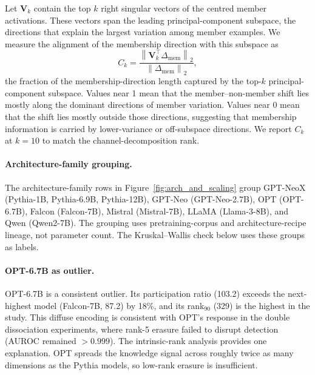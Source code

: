 Let $\mathbf{V}_k$ contain the top $k$ right singular vectors of the centred member activations. These vectors span the leading principal-component subspace, the directions that explain the largest variation among member examples. We measure the alignment of the membership direction with this subspace as
\begin{equation}
C_k = \frac{\left\|\mathbf{V}_k^\top \Delta_{\mathrm{mem}}\right\|_2}{\left\|\Delta_{\mathrm{mem}}\right\|_2},
\label{eq:concentration_ck}
\end{equation}
the fraction of the membership-direction length captured by the top-$k$ principal-component subspace. Values near 1 mean that the member--non-member shift lies mostly along the dominant directions of member variation. Values near 0 mean that the shift lies mostly outside those directions, suggesting that membership information is carried by lower-variance or off-subspace directions. We report $C_k$ at $k = 10$ to match the channel-decomposition rank.

\paragraph{Architecture-family grouping.}
The architecture-family rows in Figure~\ref{fig:arch_and_scaling} group GPT-NeoX (Pythia-1B, Pythia-6.9B, Pythia-12B), GPT-Neo (GPT-Neo-2.7B), OPT (OPT-6.7B), Falcon (Falcon-7B), Mistral (Mistral-7B), LLaMA (Llama-3-8B), and Qwen (Qwen2-7B). The grouping uses pretraining-corpus and architecture-recipe lineage, not parameter count. The Kruskal--Wallis check below uses these groups as labels.

\paragraph{OPT-6.7B as outlier.}
OPT-6.7B is a consistent outlier. Its participation ratio (103.2) exceeds the next-highest model (Falcon-7B, 87.2) by 18\%, and its rank$_{90}$ (329) is the highest in the study.
This diffuse encoding is consistent with OPT's response in the double dissociation experiments, where rank-5 erasure failed to disrupt detection (AUROC remained $> 0.999$).
The intrinsic-rank analysis provides one explanation. OPT spreads the knowledge signal across roughly twice as many dimensions as the Pythia models, so low-rank erasure is insufficient.

